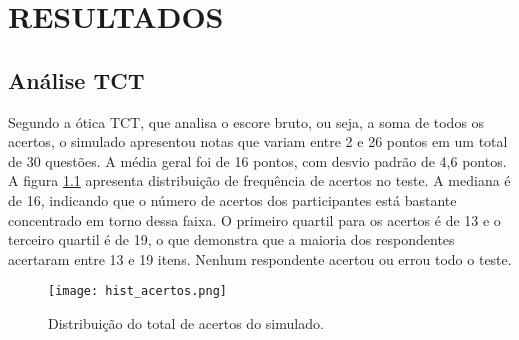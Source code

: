 \chapter{RESULTADOS}

\section{Análise TCT}

Segundo a ótica TCT, que analisa o escore bruto, ou seja, a soma de todos os acertos, o simulado apresentou notas que variam entre 2 e 26 pontos em um total de 30 questões. A média geral foi de 16 pontos, com desvio padrão de 4,6 pontos. A figura \ref{fig:hist_acertos} apresenta distribuição de frequência de acertos no teste. A mediana é de 16, indicando que o número de acertos dos participantes está bastante concentrado em torno dessa faixa. O primeiro quartil para os acertos é de 13 e o terceiro quartil é de 19, o que demonstra que a maioria dos respondentes acertaram entre 13 e 19 itens. Nenhum respondente acertou ou errou todo o teste.

\begin{figure}[H]
	\centering
	\caption{Distribuição do total de acertos do simulado.}
	\texttt{[image: hist\_acertos.png]}
	\label{fig:hist_acertos}
	\parbox{\textwidth}{
	\centering %
}
\end{figure}

